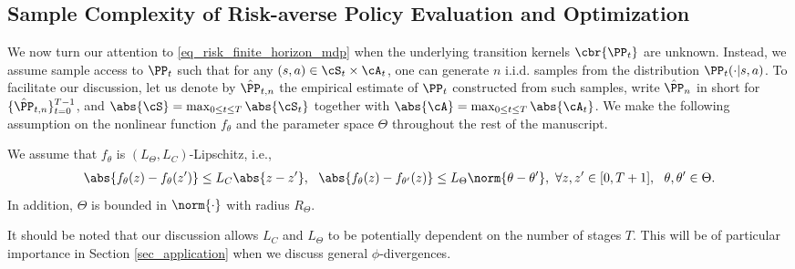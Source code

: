 \documentclass[9pt]{article}
\numberwithin{equation}{section}
\begin{document}


\subsection{Sample Complexity of Risk-averse Policy Evaluation and Optimization}\label{subsec_sample_finite_mdp}

We now turn our attention to \eqref{eq_risk_finite_horizon_mdp} when the underlying transition kernels $\cbr{\PP_t}$ are unknown. 
Instead, we assume sample access to ${\PP_t}$ such that for any $(s, a) \in \cS_t \times \cA_t$, one can generate $n$ i.i.d. samples from the distribution $\PP_t(\cdot|s, a)$.
To facilitate our discussion, let us denote by $\hat{\PP}_{t,n}$ the empirical estimate of $\PP_t$ constructed from such samples, 
 write $\hat{\PP}_n$ in short for $\{\hat{\PP}_{t,n}\}_{t=0}^{T-1}$,
and $\abs{\cS} = \max_{0 \leq t \leq T} \abs{\cS_t}$
together with $\abs{\cA} = \max_{0 \leq t \leq T} \abs{\cA_t}$.
We make the following assumption on the nonlinear function $f_\theta$ and the parameter space $\Theta$ throughout the rest of the manuscript. 

\begin{assumption}\label{assump_basic}
    We assume that $f_\theta$ is $(L_\Theta, L_C)$-Lipschitz, i.e.,
    \begin{align*}
        \abs{f_\theta(z) - f_\theta(z')}  \leq L_C \abs{z - z'}, ~~
        \abs{f_{\theta}(z) - f_{\theta'}(z)}  \leq L_\Theta \norm{\theta - \theta'}, 
        ~ \forall z, z' \in [0, T+1], ~~ \theta, \theta' \in \Theta.
    \end{align*}
    In addition, $\Theta$ is bounded in $\norm{\cdot}$ with radius $R_\Theta$.
\end{assumption}
It should be noted that our discussion allows $L_C$ and $L_\Theta$ to be potentially dependent on the number of stages $T$.
This will be of particular importance in Section \ref{sec_application} when we discuss general $\phi$-divergences. 



\end{document}
